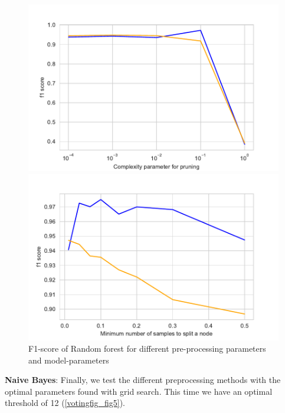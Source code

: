 \documentclass[11pt]{article}
\begin{document}
\begin{figure}
\begin{minipage}[l]{0.3\textwidth}
\end{minipage}\\
\begin{minipage}[t]{0.3\textwidth}
\includegraphics[width=1\linewidth]{voting/ccp_alpha_rdf.pdf}
\end{minipage}
\begin{minipage}[t]{0.3\textwidth}
\includegraphics[width=1\linewidth]{voting/min_samples_split_rdf.pdf}
\end{minipage}
\begin{minipage}[t]{0.3\textwidth}
\end{minipage}
   \caption{F1-score of Random forest for different pre-processing parameters and model-parameters}
\label{votingfig_fig4}
\end{figure}

\textbf{Naive Bayes}: Finally, we test the different preprocessing methods with the optimal parameters found with grid search. This time we have an optimal threshold of 12 (\ref{votingfig_fig5}). 
\end{document}

